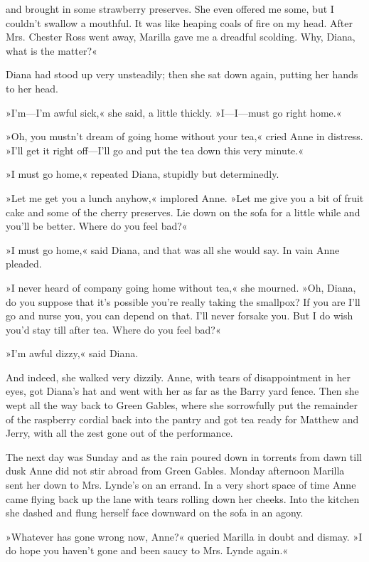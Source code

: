 and brought in some strawberry preserves. She even offered me some, but I couldn’t swallow a mouthful. It was like heaping coals of fire on my head. After Mrs. Chester Ross went away, Marilla gave me a dreadful scolding. Why, Diana, what is the matter?«

Diana had stood up very unsteadily; then she sat down again, putting her hands to her head.

»I’m—I’m awful sick,« she said, a little thickly. »I—I—must go right home.«

»Oh, you mustn’t dream of going home without your tea,« cried Anne in distress. »I’ll get it right off—I’ll go and put the tea down this very minute.«

»I must go home,« repeated Diana, stupidly but determinedly.

»Let me get you a lunch anyhow,« implored Anne. »Let me give you a bit of fruit cake and some of the cherry preserves. Lie down on the sofa for a little while and you’ll be better. Where do you feel bad?«

»I must go home,« said Diana, and that was all she would say. In vain Anne pleaded.

»I never heard of company going home without tea,« she mourned. »Oh, Diana, do you suppose that it’s possible you’re really taking the smallpox? If you are I’ll go and nurse you, you can depend on that. I’ll never forsake you. But I do wish you’d stay till after tea. Where do you feel bad?«

»I’m awful dizzy,« said Diana.

And indeed, she walked very dizzily. Anne, with tears of disappointment in her eyes, got Diana’s hat and went with her as far as the Barry yard fence. Then she wept all the way back to Green Gables, where she sorrowfully put the remainder of the raspberry cordial back into the pantry and got tea ready for Matthew and Jerry, with all the zest gone out of the performance.

The next day was Sunday and as the rain poured down in torrents from dawn till dusk Anne did not stir abroad from Green Gables. Monday afternoon Marilla sent her down to Mrs. Lynde’s on an errand. In a very short space of time Anne came flying back up the lane with tears rolling down her cheeks. Into the kitchen she dashed and flung herself face downward on the sofa in an agony.

»Whatever has gone wrong now, Anne?« queried Marilla in doubt and dismay. »I do hope you haven’t gone and been saucy to Mrs. Lynde again.«

